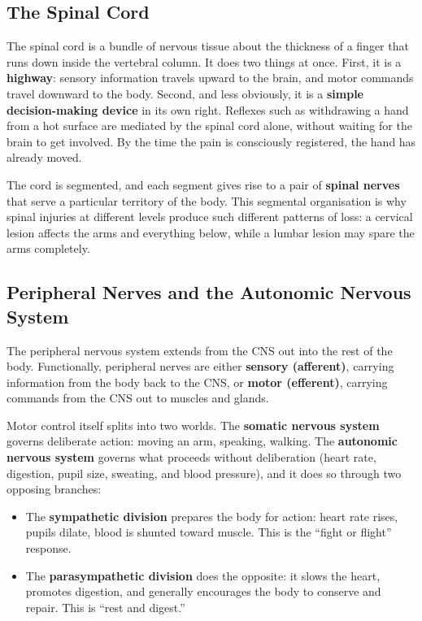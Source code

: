 \documentclass[11pt]{article}
\begin{document}
\subsection{The Spinal Cord}

The spinal cord is a bundle of nervous tissue about the thickness of a finger that runs down inside the vertebral column. It does two things at once. First, it is a \textbf{highway}: sensory information travels upward to the brain, and motor commands travel downward to the body. Second, and less obviously, it is a \textbf{simple decision-making device} in its own right. Reflexes such as withdrawing a hand from a hot surface are mediated by the spinal cord alone, without waiting for the brain to get involved. By the time the pain is consciously registered, the hand has already moved.

The cord is segmented, and each segment gives rise to a pair of \textbf{spinal nerves} that serve a particular territory of the body. This segmental organisation is why spinal injuries at different levels produce such different patterns of loss: a cervical lesion affects the arms and everything below, while a lumbar lesion may spare the arms completely.

\subsection{Peripheral Nerves and the Autonomic Nervous System}

The peripheral nervous system extends from the CNS out into the rest of the body. Functionally, peripheral nerves are either \textbf{sensory (afferent)}, carrying information from the body back to the CNS, or \textbf{motor (efferent)}, carrying commands from the CNS out to muscles and glands.

Motor control itself splits into two worlds. The \textbf{somatic nervous system} governs deliberate action: moving an arm, speaking, walking. The \textbf{autonomic nervous system} governs what proceeds without deliberation (heart rate, digestion, pupil size, sweating, and blood pressure), and it does so through two opposing branches:

\begin{itemize}
    \item The \textbf{sympathetic division} prepares the body for action: heart rate rises, pupils dilate, blood is shunted toward muscle. This is the ``fight or flight'' response.
    \item The \textbf{parasympathetic division} does the opposite: it slows the heart, promotes digestion, and generally encourages the body to conserve and repair. This is ``rest and digest.''
\end{itemize}
\end{document}
